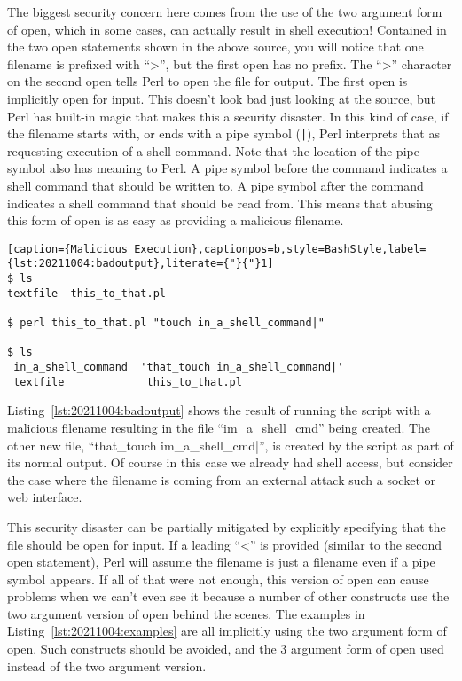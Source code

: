 The biggest security concern here comes from the use of the two argument form of open, which in some cases, can actually result in shell execution! Contained in the two open statements shown in the above source, you will notice that one filename is prefixed with ``>'', but the first open has no prefix. The ``>'' character on the second open tells Perl to open the file for output. The first open is implicitly open for input. This doesn't look bad just looking at the source, but Perl has built-in magic that makes this a security disaster. In this kind of case, if the filename starts with, or ends with a pipe symbol (\texttt{|}), Perl interprets that as requesting execution of a shell command. Note that the location of the pipe symbol also has meaning to Perl. A pipe symbol before the command indicates a shell command that should be written to. A pipe symbol after the command indicates a shell command that should be read from. This means that abusing this form of open is as easy as providing a malicious filename.

\begin{lstlisting}[caption={Malicious Execution},captionpos=b,style=BashStyle,label={lst:20211004:badoutput},literate={"}{"}1]
$ ls
textfile  this_to_that.pl

$ perl this_to_that.pl "touch in_a_shell_command|"

$ ls
 in_a_shell_command  'that_touch in_a_shell_command|'
 textfile             this_to_that.pl
\end{lstlisting}

Listing~\ref{lst:20211004:badoutput} shows the result of running the script with a malicious filename resulting in the file ``im\_a\_shell\_cmd'' being created. The other new file, ``that\_touch im\_a\_shell\_cmd|'', is created by the script as part of its normal output. Of course in this case we already had shell access, but consider the case where the filename is coming from an external attack such a socket or web interface.

This security disaster can be partially mitigated by explicitly specifying that the file should be open for input. If a leading ``<'' is provided (similar to the second open statement), Perl will assume the filename is just a filename even if a pipe symbol appears. If all of that were not enough, this version of open can cause problems when we can't even see it because a number of other constructs use the two argument version of open behind the scenes. The examples in Listing~\ref{lst:20211004:examples} are all implicitly using the two argument form of open.\autocite{20211004:svoboda} Such constructs should be avoided, and the 3 argument form of open used instead of the two argument version.\autocite{20211004:dimov}

